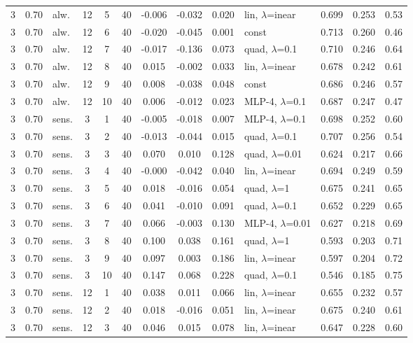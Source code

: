 \begin{scriptsize}
\begin{longtable}{cclcc c ccc l ccc}
3 & 0.70 & alw. & 12 & 5 & 40 & -0.006 & -0.032 & 0.020 & lin, $\lambda$=inear & 0.699 & 0.253 & 0.53 \\
3 & 0.70 & alw. & 12 & 6 & 40 & -0.020 & -0.045 & 0.001 & const & 0.713 & 0.260 & 0.46 \\
3 & 0.70 & alw. & 12 & 7 & 40 & -0.017 & -0.136 & 0.073 & quad, $\lambda$=0.1 & 0.710 & 0.246 & 0.64 \\
3 & 0.70 & alw. & 12 & 8 & 40 & 0.015 & -0.002 & 0.033 & lin, $\lambda$=inear & 0.678 & 0.242 & 0.61 \\
3 & 0.70 & alw. & 12 & 9 & 40 & 0.008 & -0.038 & 0.048 & const & 0.686 & 0.246 & 0.57 \\
3 & 0.70 & alw. & 12 & 10 & 40 & 0.006 & -0.012 & 0.023 & MLP-4, $\lambda$=0.1 & 0.687 & 0.247 & 0.47 \\
3 & 0.70 & sens. & 3 & 1 & 40 & -0.005 & -0.018 & 0.007 & MLP-4, $\lambda$=0.1 & 0.698 & 0.252 & 0.60 \\
3 & 0.70 & sens. & 3 & 2 & 40 & -0.013 & -0.044 & 0.015 & quad, $\lambda$=0.1 & 0.707 & 0.256 & 0.54 \\
3 & 0.70 & sens. & 3 & 3 & 40 & 0.070 & 0.010 & 0.128 & quad, $\lambda$=0.01 & 0.624 & 0.217 & 0.66 \\
3 & 0.70 & sens. & 3 & 4 & 40 & -0.000 & -0.042 & 0.040 & lin, $\lambda$=inear & 0.694 & 0.249 & 0.59 \\
3 & 0.70 & sens. & 3 & 5 & 40 & 0.018 & -0.016 & 0.054 & quad, $\lambda$=1 & 0.675 & 0.241 & 0.65 \\
3 & 0.70 & sens. & 3 & 6 & 40 & 0.041 & -0.010 & 0.091 & quad, $\lambda$=0.1 & 0.652 & 0.229 & 0.65 \\
3 & 0.70 & sens. & 3 & 7 & 40 & 0.066 & -0.003 & 0.130 & MLP-4, $\lambda$=0.01 & 0.627 & 0.218 & 0.69 \\
3 & 0.70 & sens. & 3 & 8 & 40 & 0.100 & 0.038 & 0.161 & quad, $\lambda$=1 & 0.593 & 0.203 & 0.71 \\
3 & 0.70 & sens. & 3 & 9 & 40 & 0.097 & 0.003 & 0.186 & lin, $\lambda$=inear & 0.597 & 0.204 & 0.72 \\
3 & 0.70 & sens. & 3 & 10 & 40 & 0.147 & 0.068 & 0.228 & quad, $\lambda$=0.1 & 0.546 & 0.185 & 0.75 \\
3 & 0.70 & sens. & 12 & 1 & 40 & 0.038 & 0.011 & 0.066 & lin, $\lambda$=inear & 0.655 & 0.232 & 0.57 \\
3 & 0.70 & sens. & 12 & 2 & 40 & 0.018 & -0.016 & 0.051 & lin, $\lambda$=inear & 0.675 & 0.240 & 0.61 \\
3 & 0.70 & sens. & 12 & 3 & 40 & 0.046 & 0.015 & 0.078 & lin, $\lambda$=inear & 0.647 & 0.228 & 0.60 \\

\end{longtable}
\end{scriptsize}
